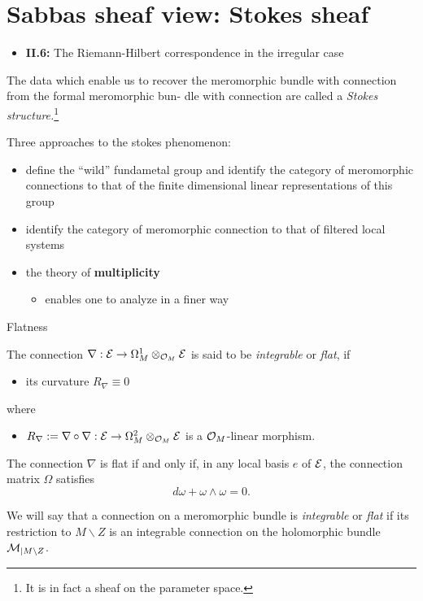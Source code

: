 \section{Sabbas sheaf view: Stokes sheaf}%
\begin{frame}[t]
  {\Huge\insertsection{}}
  \begin{itemize}
    \item \cite{sabbah2007isomonodromic} \textbf{II.6:}
      The Riemann-Hilbert correspondence in the irregular case
  \end{itemize}

  \textcolor{green!60!black}{%
    The data which enable us to recover the meromorphic bundle with connection
    from the formal meromorphic bun- dle with connection are called a
    \emph{Stokes structure.}\footnote{It is in fact a sheaf on the parameter
    space.}
  }

  Three approaches to the stokes phenomenon:
  \begin{itemize}
    \item define the ``wild'' fundametal group and identify the category of
      meromorphic connections to that of the finite dimensional linear
      representations of this group
    \item identify the category of meromorphic connection to that of filtered
      local systems
    \item the theory of \textbf{multiplicity}
      \begin{itemize}
        \item enables one to analyze in a finer way
      \end{itemize}
  \end{itemize}
\end{frame}

\begin{frame}[t]{Flatness}
  \begin{defn}[0.12.2]
    The connection $\nabla:\mathcal{E}\to \Omega_M^1\otimes_{\mathcal{O}_M}\mathcal{E}$ is said to be
    \emph{integrable} or \emph{flat}, if
    \begin{itemize}
      \item its curvature $R_\nabla\equiv0$
    \end{itemize}
    where
    \begin{itemize}
      \item $R_\nabla:=\nabla\circ\nabla:\mathcal{E}\to\Omega_M^2\otimes_{\mathcal{O}_M}\mathcal{E}$
        is a $\mathcal{O}_M$-linear morphism.
    \end{itemize}
  \end{defn}
  \begin{prop}[0.12.4]
    The connection $\nabla$ is flat if and only if, in any local basis $e$ of
    $\mathcal{E}$, the connection matrix $\Omega$ satisfies
    \[
      d\omega + \omega \wedge \omega = 0.
    \]
  \end{prop}
  We will say that a connection on a meromorphic bundle is \emph{integrable}
  or \emph{flat} if its restriction to $M\backslash Z$ is an integrable connection on
  the holomorphic bundle $\mathcal{M}_{|M\backslash Z}$.

\end{frame}

